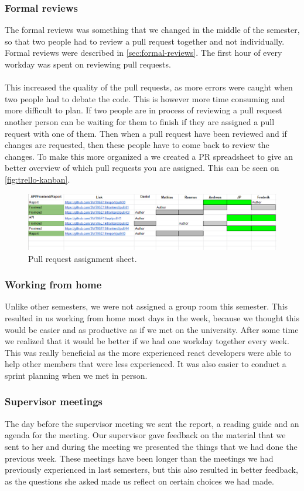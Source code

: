 \subsubsection{Formal reviews}
The formal reviews was something that we changed in the middle of the semester, so that two people had to review a pull request together and not individually.
Formal reviews were described in \autoref{sec:formal-reviews}.
The first hour of every workday was spent on reviewing pull requests.
\\\\
This increased the quality of the pull requests, as more errors were caught when two people had to debate the code.
This is however more time consuming and more difficult to plan.
If two people are in process of reviewing a pull request another person can be waiting for them to finish if they are assigned a pull request with one of them. 
Then when a pull request have been reviewed and if changes are requested, then these people have to come back to review the changes.
To make this more organized a we created a PR spreadsheet to give an better overview of which pull requests you are assigned.
This can be seen on \autoref{fig:trello-kanban}.
\begin{figure}[H]
    \centering
    \includegraphics[width=\linewidth]{figures/formal-reviews.PNG}
    \caption{Pull request assignment sheet.}
    \label{fig:trello-kanban}
\end{figure}

\subsubsection{Working from home}
Unlike other semesters, we were not assigned a group room this semester.
This resulted in us working from home most days in the week, because we thought this would be easier and as productive as if we met on the university.
After some time we realized that it would be better if we had one workday together every week.
This was really beneficial as the more experienced react developers were able to help other members that were less experienced.
It was also easier to conduct a sprint planning when we met in person.

\subsubsection{Supervisor meetings}
The day before the supervisor meeting we sent the report, a reading guide and an agenda for the meeting.
Our supervisor gave feedback on the material that we sent to her and during the meeting we presented the things that we had done the previous week.
These meetings have been longer than the meetings we had previously experienced in last semesters, but this also resulted in better feedback, as the questions she asked made us reflect on certain choices we had made.
